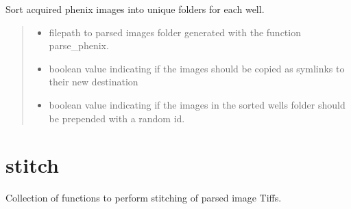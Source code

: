 \documentclass[a4paper,10pt,english,openany,oneside]{sphinxmanual}
\begin{document}
\begin{fulllineitems}
\label{\detokenize{pages/modules:sparcstools.parse.sort_wells}}
\pysigstartsignatures
{}
\pysigstopsignatures
\sphinxAtStartPar
Sort acquired phenix images into unique folders for each well.
\begin{quote}\begin{description}
\begin{itemize}
\item {} 
\sphinxAtStartPar
{} \textendash{} filepath to parsed images folder generated with the function parse\_phenix.

\item {} 
\sphinxAtStartPar
{} \textendash{} boolean value indicating if the images should be copied as symlinks to their new destination

\item {} 
\sphinxAtStartPar
{} \textendash{} boolean value indicating if the images in the sorted wells folder should be prepended with a random id.

\end{itemize}

\end{description}\end{quote}

\end{fulllineitems}

\label{\detokenize{pages/modules:module-sparcstools.stitch}}

\section{stitch}
\label{\detokenize{pages/modules:stitch}}
\sphinxAtStartPar
Collection of functions to perform stitching of parsed image Tiffs.
\end{document}
